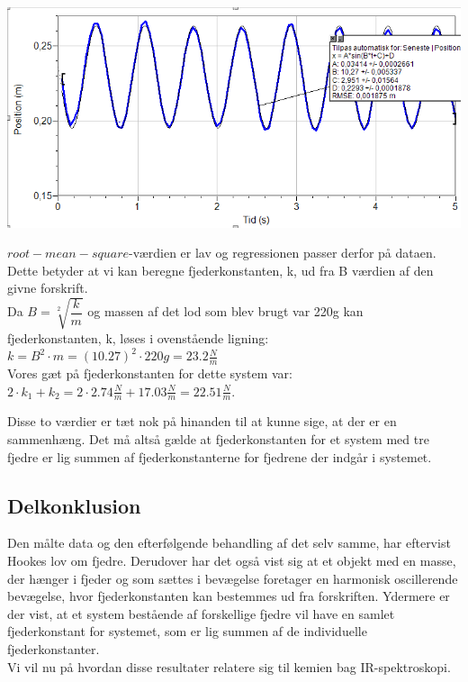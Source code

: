 \begin{center}
\includegraphics[scale=0.7]{Billeder/graf4}
\end{center}

$root-mean-square$-værdien er lav og regressionen passer derfor på dataen. Dette betyder at vi kan beregne fjederkonstanten, k, ud fra B værdien af den givne forskrift.
\\

Da $B=\sqrt[2]{\dfrac{k}{m}}$ og massen af det lod som blev brugt var 220g kan fjederkonstanten, k, løses i ovenstående ligning:
\\

$k=B^2 \cdot m = (10.27)^2 \cdot 220g = 23.2 \frac{N}{m}$
\\

Vores gæt på fjederkonstanten for dette system var: $2 \cdot k_1 + k_2 = 2 \cdot 2.74 \frac{N}{m} + 17.03 \frac{N}{m} = 22.51 \frac{N}{m}$. 

Disse to værdier er tæt nok på hinanden til at kunne sige, at der er en sammenhæng. Det må altså gælde at fjederkonstanten for et system med tre fjedre er lig summen af fjederkonstanterne for fjedrene der indgår i systemet. 
\\

\subsection{Delkonklusion}\label{sec:del}
Den målte data og den efterfølgende behandling af det selv samme, har eftervist Hookes lov om fjedre. Derudover har det også vist sig at et objekt med en masse, der hænger i fjeder og som sættes i bevægelse foretager en harmonisk oscillerende bevægelse, hvor fjederkonstanten kan bestemmes ud fra forskriften. Ydermere er der vist, at et system bestående af forskellige fjedre vil have en samlet fjederkonstant for systemet, som er lig summen af de individuelle fjederkonstanter.
\\

Vi vil nu på hvordan disse resultater relatere sig til kemien bag IR-spektroskopi.